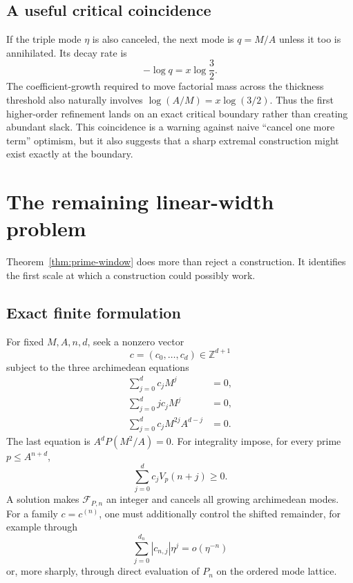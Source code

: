 \documentclass[11pt,oneside]{article}
\theoremstyle{definition}
\theoremstyle{remark}
\newcommand{\Z}{\mathbb Z}
\newcommand{\cF}{\mathcal F}
\begin{document}
\subsection{A useful critical coincidence}

If the triple mode $\eta$ is also canceled, the next mode is $q=M/A$ unless it too is
annihilated.  Its decay rate is
\begin{equation}
 -\log q=x\log\frac32.
 \label{eq:q-decay}
\end{equation}
The coefficient-growth required to move factorial mass across the thickness threshold also
naturally involves $\log(A/M)=x\log(3/2)$.  Thus the first higher-order refinement lands on an
exact critical boundary rather than creating abundant slack.  This coincidence is a warning
against naive ``cancel one more term'' optimism, but it also suggests that a sharp extremal
construction might exist exactly at the boundary.

\section{The remaining linear-width problem}
\label{sec:search-target}

Theorem~\ref{thm:prime-window} does more than reject a construction.  It identifies the
first scale at which a construction could possibly work.

\subsection{Exact finite formulation}

For fixed $M,A,n,d$, seek a nonzero vector
\begin{equation}
 c=(c_0,\ldots,c_d)\in\Z^{d+1}
 \label{eq:c-vector}
\end{equation}
subject to the three archimedean equations
\begin{align}
 \sum_{j=0}^dc_jM^j&=0,
 \label{eq:lin-M}\\
 \sum_{j=0}^djc_jM^j&=0,
 \label{eq:lin-derivative}\\
 \sum_{j=0}^dc_jM^{2j}A^{d-j}&=0.
 \label{eq:lin-lambda}
\end{align}
The last equation is $A^dP(M^2/A)=0$.  For integrality impose, for every prime
$p\le A^{n+d}$,
\begin{equation}
 \sum_{j=0}^dc_jV_p(n+j)\ge0.
 \label{eq:prime-ILP}
\end{equation}
A solution makes $\cF_{P,n}$ an integer and cancels all growing archimedean modes.
For a family $c=c^{(n)}$, one must additionally control the shifted remainder, for example
through
\begin{equation}
 \sum_{j=0}^{d_n}|c_{n,j}|\eta^j=o(\eta^{-n})
 \label{eq:height-condition-crude}
\end{equation}
or, more sharply, through direct evaluation of $P_n$ on the ordered mode lattice.
\end{document}
